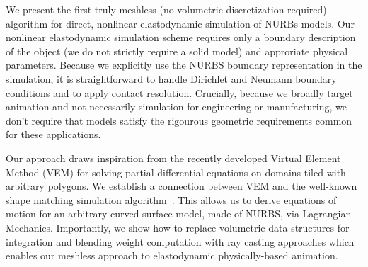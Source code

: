 We present the first truly meshless (no volumetric discretization required) algorithm for direct, nonlinear elastodynamic simulation of NURBs models. 
Our nonlinear elastodynamic simulation scheme requires only a boundary description of the object (we do not strictly require a solid model) and
approriate physical parameters.  
Because we explicitly use the NURBS boundary representation in the simulation, it is straightforward to handle
Dirichlet and Neumann boundary conditions and to apply contact resolution. 
Crucially, because we broadly target animation and not necessarily simulation for engineering or manufacturing, we don't require that models
satisfy the rigourous geometric requirements common for these applications.

Our approach draws inspiration from the recently developed Virtual Element Method (VEM) for solving partial differential equations on domains tiled with arbitrary polygons.
We establish a connection between VEM and the well-known shape matching simulation algorithm~\cite{10.1145/1073204.1073216,10.1145/2019406.2019438}. This allows us 
to derive equations of motion for an arbitrary curved surface model, made of NURBS, via Lagrangian Mechanics. 
Importantly, we show how to replace volumetric data structures for integration and blending weight computation with ray casting approaches which enables
our meshless approach to elastodynamic physically-based animation.

